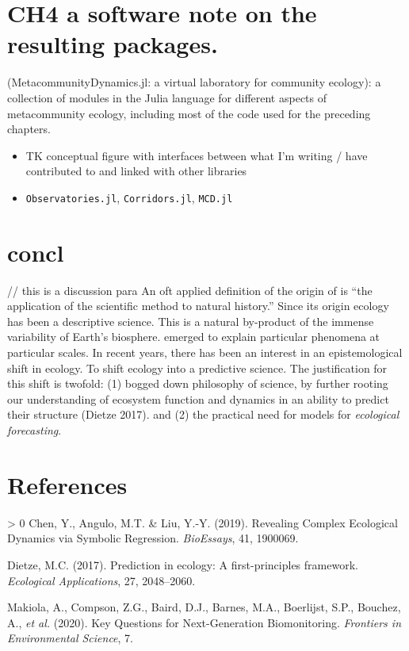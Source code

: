 \documentclass[10pt,oneside]{article}
\newlength{\cslhangindent}
\newenvironment{CSLReferences}[3] %
 {%
  \setlength{\parindent}{0pt}
  \ifodd #1 \everypar{\setlength{\hangindent}{\cslhangindent}}\ignorespaces\fi
  \ifnum #2 > 0
  \setlength{\parskip}{#2\baselineskip}
  \fi
 }%
 {}
\begin{document}
\hypertarget{ch4-a-software-note-on-the-resulting-packages.}{%
\section{CH4 a software note on the resulting
packages.}\label{ch4-a-software-note-on-the-resulting-packages.}}

(MetacommunityDynamics.jl: a virtual laboratory for community ecology):
a collection of modules in the Julia language for different aspects of
metacommunity ecology, including most of the code used for the preceding
chapters.

\begin{itemize}
\item
  TK conceptual figure with interfaces between what I'm writing / have
  contributed to and linked with other libraries
\item
  \texttt{Observatories.jl}, \texttt{Corridors.jl}, \texttt{MCD.jl}
\end{itemize}

\hypertarget{concl}{%
\section{concl}\label{concl}}

// this is a discussion para An oft applied definition of the origin of
is ``the application of the scientific method to natural history.''
Since its origin ecology has been a descriptive science. This is a
natural by-product of the immense variability of Earth's biosphere.
emerged to explain particular phenomena at particular scales. In recent
years, there has been an interest in an epistemological shift in
ecology. To shift ecology into a predictive science. The justification
for this shift is twofold: (1) bogged down philosophy of science, by
further rooting our understanding of ecosystem function and dynamics in
an ability to predict their structure (Dietze 2017). and (2) the
practical need for models for \emph{ecological forecasting}.

\hypertarget{references}{%
\section*{References}\label{references}}

\hypertarget{refs}{}
\begin{CSLReferences}{1}{0}
\leavevmode\hypertarget{ref-Chen2019RevCom}{}%
Chen, Y., Angulo, M.T. \& Liu, Y.-Y. (2019). Revealing Complex
Ecological Dynamics via Symbolic Regression. \emph{BioEssays}, 41,
1900069.

\leavevmode\hypertarget{ref-Dietze2017PreEco}{}%
Dietze, M.C. (2017). Prediction in ecology: A first-principles
framework. \emph{Ecological Applications}, 27, 2048--2060.

\leavevmode\hypertarget{ref-Makiola2020KeyQue}{}%
Makiola, A., Compson, Z.G., Baird, D.J., Barnes, M.A., Boerlijst, S.P.,
Bouchez, A., \emph{et al.} (2020). Key Questions for Next-Generation
Biomonitoring. \emph{Frontiers in Environmental Science}, 7.

\end{CSLReferences}
\end{document}
